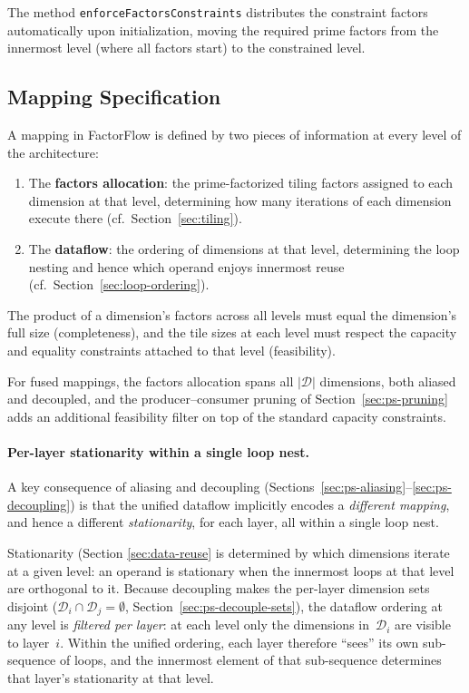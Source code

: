 \noindent
The method \texttt{enforceFactorsConstraints} distributes the
constraint factors automatically upon initialization, moving the
required prime factors from the innermost level (where all factors
start) to the constrained level.


\subsection{Mapping Specification}
\label{sec:ps-mapping-spec}

A mapping in FactorFlow is defined by two pieces of information at
every level of the architecture:
\begin{enumerate}
  \item The \textbf{factors allocation}: the prime-factorized tiling
        factors assigned to each dimension at that level, determining
        how many iterations of each dimension execute there
        (cf.\ Section~\ref{sec:tiling}).
  \item The \textbf{dataflow}: the ordering of dimensions at that
        level, determining the loop nesting and hence which operand
        enjoys innermost reuse
        (cf.\ Section~\ref{sec:loop-ordering}).
\end{enumerate}

\noindent
The product of a dimension's factors across all levels must equal the
dimension's full size (completeness), and the tile sizes at each level
must respect the capacity and equality constraints attached to that
level (feasibility).

For fused mappings, the factors allocation spans all $|\mathcal{D}|$
dimensions, both aliased and decoupled, and the
producer--consumer pruning of Section~\ref{sec:ps-pruning} adds an
additional feasibility filter on top of the standard capacity
constraints.

\paragraph{Per-layer stationarity within a single loop nest.}
A key consequence of aliasing and decoupling
(Sections~\ref{sec:ps-aliasing}--\ref{sec:ps-decoupling}) is that the
unified dataflow implicitly encodes a \emph{different mapping}, and
hence a different \emph{stationarity}, for each layer, all within a
single loop nest.

Stationarity (Section \ref{sec:data-reuse} is determined by which dimensions iterate at
a given level: an operand is stationary when the innermost loops at
that level are orthogonal to it.
Because decoupling makes the per-layer dimension sets disjoint
($\mathcal{D}_i \cap \mathcal{D}_j = \emptyset$,
Section~\ref{sec:ps-decouple-sets}), the dataflow ordering at any
level is \emph{filtered per layer}: at each level only the dimensions
in~$\mathcal{D}_i$ are visible to layer~$i$.
Within the unified ordering, each layer therefore ``sees'' its own
sub-sequence of loops, and the innermost element of that sub-sequence
determines that layer's stationarity at that level.

